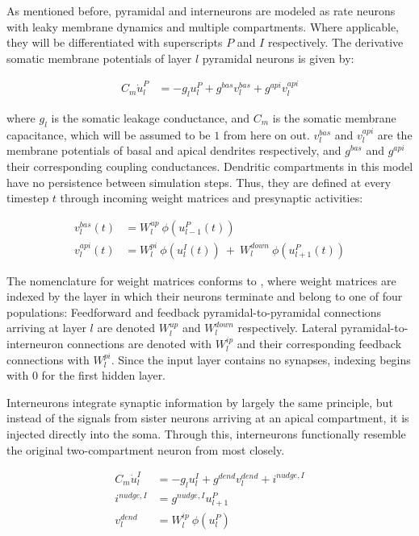 As mentioned before, pyramidal and interneurons are modeled as rate neurons with leaky membrane dynamics and multiple
compartments. Where applicable, they will be differentiated with superscripts $P$ and $I$ respectively.  The derivative
somatic membrane potentials of layer $l$ pyramidal neurons is given by:

\begin{align}
  C_m \dot{u}_l^P & = - g_l u_l^{P} + g^{bas} v_l^{bas} + g^{api} v_l^{api} \label{eq-pyr-dynamics-rate}
\end{align}

where $g_l$ is the somatic leakage conductance, and $C_m$ is the somatic membrane capacitance, which will be assumed to
be $1$ from here on out. $v_l^{bas}$ and $v_l^{api}$ are the membrane potentials of basal and apical dendrites
respectively, and $g^{bas}$ and $g^{api}$ their corresponding coupling conductances.  Dendritic compartments in this
model have no persistence between simulation steps. Thus, they are defined at every timestep $t$ through incoming weight
matrices and presynaptic activities:

\begin{align}
  v_l^{bas}(t) & = W_l^{up} \ \phi(u_{l-1}^P(t)) \label{eq-v-bas-rate}                                     \\
  v_l^{api}(t) & =  W_l^{pi} \ \phi(u_l^I(t)) \ + \  W_l^{down} \ \phi(u_{l+1}^P(t)) \label{eq-v-api-rate}
\end{align}

The nomenclature for weight matrices conforms to \cite{Haider2021}, where weight matrices are indexed by the layer in
which their neurons terminate and belong to one of four populations: Feedforward and feedback pyramidal-to-pyramidal
connections arriving at layer $l$ are denoted $W_l^{up}$ and $W_l^{down}$ respectively. Lateral pyramidal-to-interneuron
connections are denoted with $W_l^{ip}$ and their corresponding feedback connections with $W_l^{pi}$. Since the input
layer contains no synapses, indexing begins with $0$ for the first hidden layer.
\newline

Interneurons integrate synaptic information by largely the same principle, but instead of the signals from sister
neurons arriving at an apical compartment, it is injected directly into the soma. Through this, interneurons
functionally resemble the original two-compartment neuron from \cite{urbanczik2014learning} most closely.

\begin{align}
  C_m \dot{u}_l^I & = - g_l u_l^{I} + g^{dend} v_l^{dend} + i^{nudge, I}\label{eq-intn-dynamics} \\
  i^{nudge, I}    & = g^{nudge, I} u_{l+1}^P                                                     \\
  v_l^{dend}      & = W_l^{ip} \ \phi(u_{l}^P)
\end{align}

